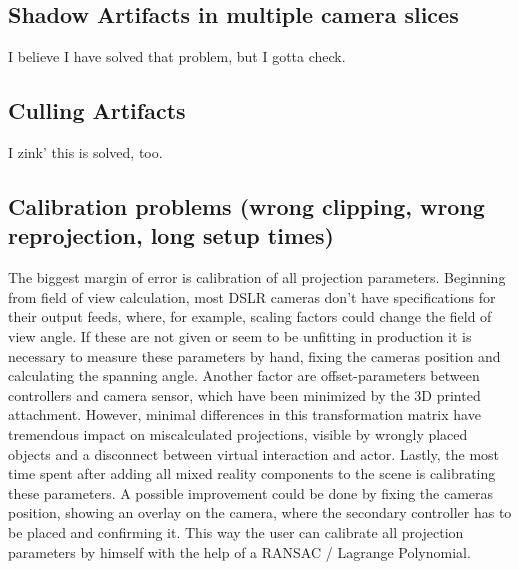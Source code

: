 \subsection{Shadow Artifacts in multiple camera slices}

I believe I have solved that problem, but I gotta check.

\subsection{Culling Artifacts}

I zink' this is solved, too.

\subsection{Calibration problems (wrong clipping, wrong reprojection, long 
setup times)}

The biggest margin of error is calibration of all projection parameters.
\newline
Beginning from field of view calculation, most DSLR cameras don't have 
specifications for their output feeds, where, for example, scaling factors 
could change the field of view angle. If these are not given or seem to be 
unfitting in production it is necessary to measure these parameters by hand, 
fixing the cameras position and calculating the spanning angle.
Another factor are offset-parameters between controllers and camera sensor, 
which have been minimized by the 3D printed attachment. However, minimal 
differences in this transformation matrix have tremendous impact on 
miscalculated projections, visible by wrongly placed objects and a disconnect 
between virtual interaction and actor.
Lastly, the most time spent after adding all mixed reality components to the 
scene is calibrating these parameters. A possible improvement could be done by 
fixing the cameras position, showing an overlay on the camera, where the 
secondary controller has to be placed and confirming it. This way the user can 
calibrate all projection parameters by himself with the help of a RANSAC / 
Lagrange Polynomial.
